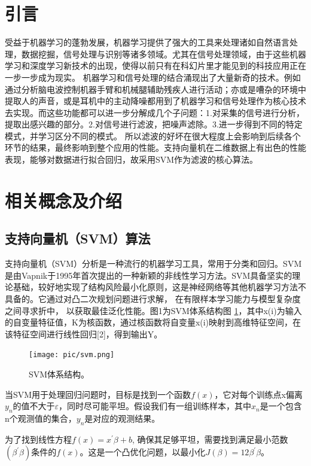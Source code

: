 \section{引言}
受益于机器学习的蓬勃发展，机器学习提供了强大的工具来处理诸如自然语言处理，数据挖掘，信号处理与识别等诸多领域。尤其在信号处理领域，由于这些机器学习和深度学习新技术的出现，使得以前只有在科幻片里才能见到的科技应用正在一步一步成为现实。
机器学习和信号处理的结合涌现出了大量新奇的技术。例如通过分析脑电波控制机器手臂和机械腿辅助残疾人进行活动；亦或是嘈杂的环境中提取人的声音，或是耳机中的主动降噪都用到了机器学习和信号处理作为核心技术去实现。而这些功能都可以进一步分解成几个子问题：1.对采集的信号进行分析，提取出感兴趣的部分。2.对信号进行滤波，把噪声滤除。3.进一步得到不同的特定模式，并学习区分不同的模式。
所以滤波的好坏在很大程度上会影响到后续各个环节的结果，最终影响到整个应用的性能。支持向量机在二维数据上有出色的性能表现，能够对数据进行拟合回归，故采用SVM作为滤波的核心算法。
\section{相关概念及介绍}
\subsection{支持向量机（SVM）算法}
支持向量机（SVM）分析是一种流行的机器学习工具，常用于分类和回归。SVM是由Vapnik于1995年首次提出的一种新颖的非线性学习方法。SVM具备坚实的理论基础，较好地实现了结构风险最小化原则，这是神经网络等其他机器学习方法不具备的。它通过对凸二次规划问题进行求解， 在有限样本学习能力与模型复杂度之间寻求折中， 以获取最佳泛化性能。图1为SVM体系结构图 \ref{fig:SVM}，其中x(i)为输入的自变量特征值，K为核函数，通过核函数将自变量x(i)映射到高维特征空间，在该特征空间进行线性回归[2]，得到输出Y。
\begin{figure}[!htbp]
    \centering
    \texttt{[image: pic/svm.png]}%
    \caption{SVM体系结构。}
    \label{fig:SVM}
\end{figure}

当SVM用于处理回归问题时，目标是找到一个函数$f\left ( x \right )$，它对每个训练点x偏离$y_n$的值不大于$\varepsilon$，同时尽可能平坦。假设我们有一组训练样本，其中$x_n$是一个包含n个观测值的集合，$y_n$是对应的观测结果。

为了找到线性方程$f(x)=x^\prime\beta+b$, 确保其足够平坦，需要找到满足最小范数$\left(\beta^\prime\beta\right)$条件的$f(x)$。这是一个凸优化问题，以最小化$J(\beta)=12\beta^\prime\beta$。

